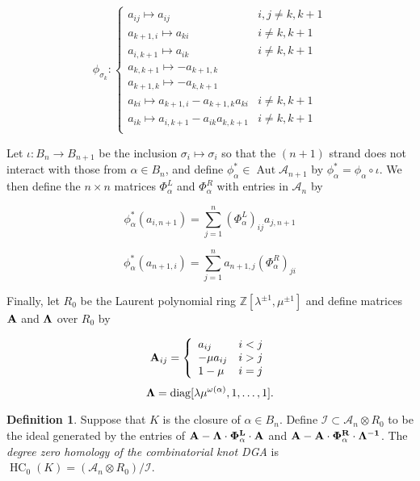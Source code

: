 \documentclass[11pt]{amsart}
\def\Z{{\mathbb Z}}
\def\A{{\mathcal A}}
\def\s{{\sigma}}
\newcommand\Aut{\operatorname{Aut}}
\newcommand\diag{\operatorname{diag}}
\theoremstyle{definition}
\newtheorem{defn}[thm]{Definition}
\begin{document}
  \begin{equation}
  \phi_{\s_k}\colon
  \left\{
       \begin{array}{lr}
         a_{ij}\mapsto a_{ij} & i,j\ne k,k+1\\
         a_{k+1,i}\mapsto a_{ki} & i\ne k,k+1\\
         a_{i,k+1}\mapsto a_{ik} & i\ne k,k+1\\
         a_{k,k+1}\mapsto -a_{k+1,k} & \\
         a_{k+1,k}\mapsto -a_{k,k+1} & \\
         a_{ki}\mapsto a_{k+1,i} - a_{k+1,k}a_{ki} & i\ne k,k+1\\
         a_{ik}\mapsto a_{i,k+1} - a_{ik}a_{k,k+1} & i\ne k,k+1\\
       \end{array}
  \right.
  \label{DefnPhiMap}
  \end{equation}

  Let $\iota\colon B_n \rightarrow B_{n+1}$ be the inclusion $\s_i\mapsto\s_i$ so that the $(n+1)$ strand does not interact with those from $\alpha\in B_n$, and define $\phi_\alpha^*\in \Aut \A_{n+1}$ by $\phi_\alpha^* = \phi_\alpha\circ\iota$. We then define the $n\times n$ matrices $\Phi_\alpha^L$ and $\Phi_\alpha^R$ with entries in $\A_n$ by

  $$\phi_\alpha^*(a_{i,n+1}) = \sum_{j=1}^n(\Phi_\alpha^L)_{ij}a_{j,n+1}$$

  $$\phi_\alpha^*(a_{n+1,i}) = \sum_{j=1}^na_{n+1,j}(\Phi_\alpha^R)_{ji}$$

  Finally, let $R_0$ be the Laurent polynomial ring $\Z[\lambda^{\pm1},\mu^{\pm1}]$ and define matrices $\bf{A}$ and $\bf{\Lambda}$ over $R_0$ by

  \begin{equation}
  {\bf A}_{ij} = 
  \left\{
       \begin{array}{lr}
        a_{ij} & i<j\\
        -\mu a_{ij} & i>j\\
        1-\mu & i = j\\
       \end{array}
  \right.
  \label{def:Amatrix}
  \end{equation}
  \begin{equation}
  {\bf \Lambda} = \diag[\lambda\mu^{\omega(\alpha)},1,\ldots,1].
  \label{defn:Lambda}
  \end{equation}

  \begin{defn}
  Suppose that $K$ is the closure of $\alpha\in B_n$. Define $\mathcal{I}\subset \A_n\otimes R_0$ to be the ideal generated by the entries of $\bf{A} - \Lambda\cdot\Phi_\alpha^L\cdot \bf{A}$ and $\bf{A} - \bf{A}\cdot\Phi_\alpha^R\cdot\Lambda^{-1}$. The \emph{degree zero homology of the combinatorial knot DGA} is $\operatorname{HC}_0(K) = (\A_n\otimes R_0)/\mathcal{I}$.
  \label{defn:HC_0}
  \end{defn}
  
\end{document}
